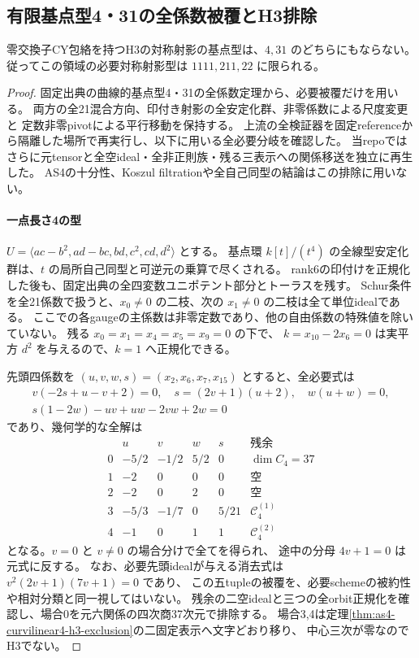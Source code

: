 \subsection{有限基点型4・31の全係数被覆とH3排除}
\label{subsec:cubic-CY-finite43-cover}
\begin{theorem}\label{thm:cubic-CY-finite43-empty}
零交換子CY包絡を持つH3の対称射影の基点型は、$4,31$ のどちらにもならない。
従ってこの領域の必要対称射影型は $1111,211,22$ に限られる。
\end{theorem}
\begin{proof}
固定出典\cite{AS4CYpinned}の曲線的基点型4・31の全係数定理から、必要被覆だけを用いる。
両方の全21混合方向、印付き射影の全安定化群、非零係数による尺度変更と
定数非零pivotによる平行移動を保持する。
上流の全検証器を固定referenceから隔離した場所で再実行し、以下に用いる全必要分岐を確認した。
当repoではさらに元tensorと全空ideal・全非正則族・残る三表示への関係移送を独立に再生した。
AS4の十分性、Koszul filtrationや全自己同型の結論はこの排除に用いない。

\paragraph{一点長さ4の型}
$U=\langle ac-b^2,ad-bc,bd,c^2,cd,d^2\rangle$ とする。
基点環 $k[t]/(t^4)$ の全線型安定化群は、$t$ の局所自己同型と可逆元の乗算で尽くされる。
rank6の印付けを正規化した後も、固定出典の全四変数ユニポテント部分とトーラスを残す。
Schur条件を全21係数で扱うと、$x_0\ne0$ の二枝、次の $x_1\ne0$ の二枝は全て単位idealである。
ここでの各gaugeの主係数は非零定数であり、他の自由係数の特殊値を除いていない。
残る $x_0=x_1=x_4=x_5=x_9=0$ の下で、
$k=x_{10}-2x_6=0$ は実平方 $d^2$ を与えるので、$k=1$ へ正規化できる。

先頭四係数を $(u,v,w,s)=(x_2,x_6,x_7,x_{15})$ とすると、全必要式は
\[
\begin{gathered}
 v(-2s+u-v+2)=0,\quad s=(2v+1)(u+2),\quad w(u+w)=0,\\
 s(1-2w)-uv+uw-2vw+2w=0
\end{gathered}
\]
であり、幾何学的な全解は
\[
\begin{array}{c|rrrr|c}
 &u&v&w&s&\text{残余}\\\hline
0&-5/2&-1/2&5/2&0&\dim C_4=37\\
1&-2&0&0&0&\text{空}\\
2&-2&0&2&0&\text{空}\\
3&-5/3&-1/7&0&5/21&\mathcal C_4^{(1)}\\
4&-1&0&1&1&\mathcal C_4^{(2)}
\end{array}
\]
となる。$v=0$ と $v\ne0$ の場合分けで全てを得られ、
途中の分母 $4v+1=0$ は元式に反する。
なお、必要先頭idealが与える消去式は $v^2(2v+1)(7v+1)=0$ であり、
この五tupleの被覆を、必要schemeの被約性や相対分類と同一視してはいない。
残余の二空idealと三つの全orbit正規化を確認し、場合0を元六関係の四次商37次元で排除する。
場合3,4は定理\ref{thm:as4-curvilinear4-h3-exclusion}の二固定表示へ文字どおり移り、
中心三次が零なのでH3でない。


\end{proof}
